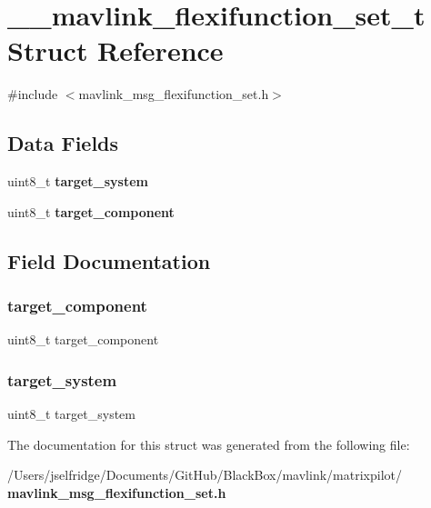 \section{\+\_\+\+\_\+mavlink\+\_\+flexifunction\+\_\+set\+\_\+t Struct Reference}
\label{struct____mavlink__flexifunction__set__t}


{\ttfamily \#include $<$mavlink\+\_\+msg\+\_\+flexifunction\+\_\+set.\+h$>$}

\subsection*{Data Fields}
\begin{DoxyCompactItemize}
\item 
uint8\+\_\+t \textbf{ target\+\_\+system}
\item 
uint8\+\_\+t \textbf{ target\+\_\+component}
\end{DoxyCompactItemize}


\subsection{Field Documentation}
\mbox{\label{struct____mavlink__flexifunction__set__t_a1763123cfc5fa7f9c51ec44947d5790f}} 
\subsubsection{target\+\_\+component}
{\footnotesize\ttfamily uint8\+\_\+t target\+\_\+component}

\mbox{\label{struct____mavlink__flexifunction__set__t_ac9afff43526a157e4c4e45607c1418b8}} 
\subsubsection{target\+\_\+system}
{\footnotesize\ttfamily uint8\+\_\+t target\+\_\+system}



The documentation for this struct was generated from the following file\+:\begin{DoxyCompactItemize}
\item 
/\+Users/jselfridge/\+Documents/\+Git\+Hub/\+Black\+Box/mavlink/matrixpilot/\textbf{ mavlink\+\_\+msg\+\_\+flexifunction\+\_\+set.\+h}\end{DoxyCompactItemize}
